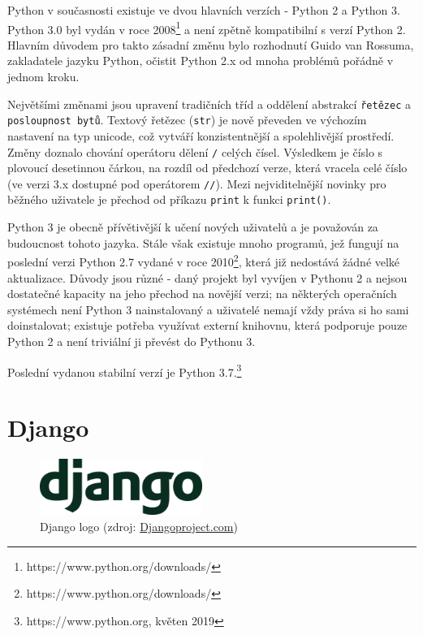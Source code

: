 Python v současnosti existuje ve dvou hlavních verzích - Python 2 a Python 3. Python 3.0 byl vydán v roce 2008\footnote{https://www.python.org/downloads/} a není zpětně kompatibilní s verzí Python 2. Hlavním důvodem pro takto zásadní změnu bylo rozhodnutí Guido van Rossuma, zakladatele jazyku Python, očistit Python 2.x od mnoha problémů pořádně v jednom kroku. 

Největšími změnami jsou upravení tradičních tříd a oddělení abstrakcí \texttt{řetězec} a \texttt{posloupnost bytů}. Textový řetězec (\texttt{str}) je nově převeden ve výchozím nastavení na typ unicode, což vytváří konzistentnější a spolehlivější prostředí. Změny doznalo chování operátoru dělení \texttt{/} celých čísel. Výsledkem je číslo s plovoucí desetinnou čárkou, na rozdíl od předchozí verze, která vracela celé číslo (ve verzi 3.x dostupné pod operátorem \texttt{//}). Mezi nejviditelnější novinky pro běžného uživatele je přechod od příkazu \texttt{print} k funkci \texttt{print()}. 

Python 3 je obecně přívětivější k učení nových uživatelů a je považován za budoucnost tohoto jazyka. Stále však existuje mnoho programů, jež fungují na poslední verzi Python 2.7 vydané v roce 2010\footnote{https://www.python.org/downloads/}, která již nedostává žádné velké aktualizace. Důvody jsou různé - daný projekt byl vyvíjen v Pythonu 2 a nejsou dostatečné kapacity na jeho přechod na novější verzi; na některých operačních systémech není Python 3 nainstalovaný a uživatelé nemají vždy práva si ho sami doinstalovat; existuje potřeba využívat externí knihovnu, která podporuje pouze Python 2 a není triviální ji převést do Pythonu 3. 

Poslední vydanou stabilní verzí je Python 3.7.\footnote{https://www.python.org, květen 2019} 

\section{Django}

\begin{figure}[H] \centering
      \includegraphics[width=150pt]{./pictures/django-logo-positive.png}
      \caption[Django logo]{Django logo (zdroj:
\href{https://static.djangoproject.com/img/logos/django-logo-positive.png}{Djangoproject.com})}
      \label{fig:django}
  \end{figure}

